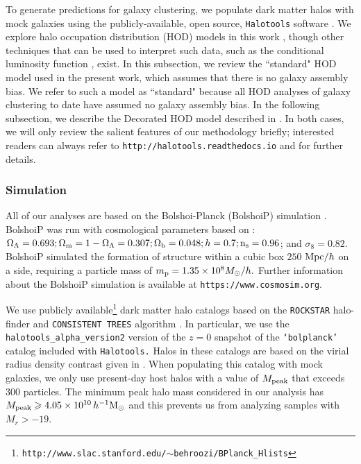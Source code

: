 \documentclass[usenatbib,usegraphicx,letterpaper]{mn2e}
\begin{document}
To generate predictions for galaxy clustering, 
we populate dark matter halos with mock galaxies using the publicly-available, 
open source, {\tt Halotools} software \citep{halotools}.
We explore halo occupation distribution (HOD) models in this work
\citep[e.g.][]{seljak00,ma_fry00,scoccimarro01a,berlind02}, though other
techniques that can be used to interpret such data, such as the conditional luminosity function
\citep[CLF, e.g.,][]{yang03,vdBosch13}, exist. In this subsection, we review the ``standard" HOD
model used in the present work, which assumes that there is no galaxy assembly bias. We refer to
such a model as ``standard" because all HOD analyses of galaxy clustering to date have assumed no
galaxy assembly bias. In the following subsection, we describe
the Decorated HOD model described in \citet{hearin_etal16}. In both cases, we will only
review the salient features of our methodology briefly;
interested readers can always refer to {\tt http://halotools.readthedocs.io} and
\citet{hearin_etal16} for further details.


\subsubsection{Simulation}

All of our analyses are based on the Bolshoi-Planck (BolshoiP) simulation \citep{riebe_etal11}.
BolshoiP was run with cosmological parameters based on \citet{planck13}:
$\Omega_{\Lambda} = 0.693; \Omega_{\rm m} = 1 - \Omega_{\Lambda} = 0.307; \Omega_{\rm b} = 0.048;
h = 0.7; {\rm n_s}=0.96$; and $\sigma_8 = 0.82$. BolshoiP simulated the formation of structure within a cubic 
box $250$ ${\rm Mpc}/h$ on a side, requiring a particle mass of $m_{\rm p} = 1.35\times10^{8}M_{\odot}/h.$
Further information about the BolshoiP simulation is available at {\tt https://www.cosmosim.org}.

We use publicly available\footnote{\tt http://www.slac.stanford.edu/$\sim$behroozi/BPlanck\_Hlists} dark matter
halo catalogs based on the {\tt ROCKSTAR} halo-finder \citep{behroozi_rockstar11} and {\tt CONSISTENT TREES} algorithm \citep{behroozi_trees13}. In particular, we use the {\tt halotools\_alpha\_version2} version of the $z=0$ snapshot
of the {\tt `bolplanck'} catalog included with {\tt Halotools.} Halos in these catalogs are based on the virial radius
density contrast given in \citet{bryan_norman98}. When populating this catalog with mock galaxies, we only use
present-day host halos with a value of $M_{\rm peak}$ that exceeds $300$ particles. The minimum 
peak halo mass considered in our analysis has $M_{\rm peak} \ge 4.05 \times 10^{10}\, h^{-1}\mathrm{M}_{\odot}$ 
and this prevents us from analyzing samples with $M_r > -19$. 
\end{document}
